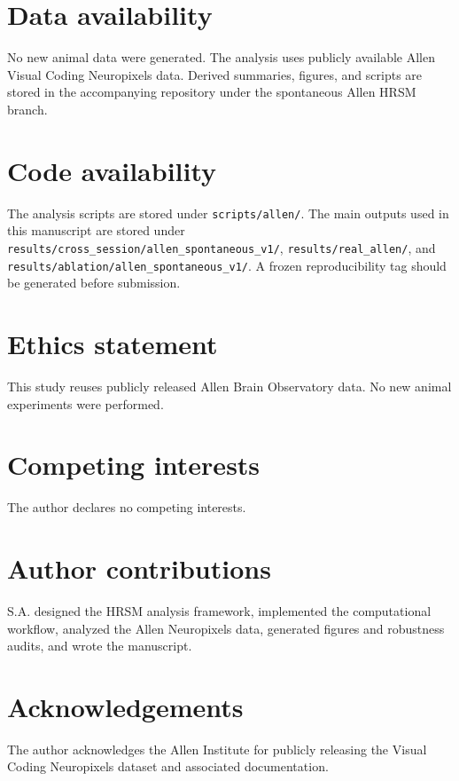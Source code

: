 \documentclass[11pt]{article}
\begin{document}
\section*{Data availability}

No new animal data were generated. The analysis uses publicly available Allen Visual Coding Neuropixels data. Derived summaries, figures, and scripts are stored in the accompanying repository under the spontaneous Allen HRSM branch.

\section*{Code availability}

The analysis scripts are stored under \texttt{scripts/allen/}. The main outputs used in this manuscript are stored under \texttt{results/cross\_session/allen\_spontaneous\_v1/}, \texttt{results/real\_allen/}, and \texttt{results/ablation/allen\_spontaneous\_v1/}. A frozen reproducibility tag should be generated before submission.

\section*{Ethics statement}

This study reuses publicly released Allen Brain Observatory data. No new animal experiments were performed.

\section*{Competing interests}

The author declares no competing interests.

\section*{Author contributions}

S.A. designed the HRSM analysis framework, implemented the computational workflow, analyzed the Allen Neuropixels data, generated figures and robustness audits, and wrote the manuscript.

\section*{Acknowledgements}

The author acknowledges the Allen Institute for publicly releasing the Visual Coding Neuropixels dataset and associated documentation.
\end{document}
